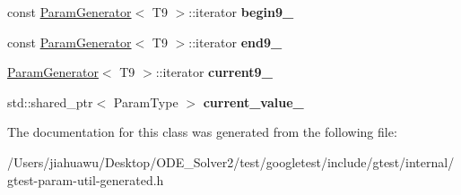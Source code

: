 \begin{DoxyCompactItemize}
\item 
\mbox{\label{classtesting_1_1internal_1_1_cartesian_product_generator9_1_1_iterator_a99069f471668c2f804507cd9af050f26}} 
const \mbox{\hyperlink{classtesting_1_1internal_1_1_param_generator}{Param\+Generator}}$<$ T9 $>$\+::iterator {\bfseries begin9\+\_\+}
\item 
\mbox{\label{classtesting_1_1internal_1_1_cartesian_product_generator9_1_1_iterator_a4046916a22aea7df3959de13dc2ae9be}} 
const \mbox{\hyperlink{classtesting_1_1internal_1_1_param_generator}{Param\+Generator}}$<$ T9 $>$\+::iterator {\bfseries end9\+\_\+}
\item 
\mbox{\label{classtesting_1_1internal_1_1_cartesian_product_generator9_1_1_iterator_a1fc558b062c44ffd7af98afa0ae6ddb2}} 
\mbox{\hyperlink{classtesting_1_1internal_1_1_param_generator}{Param\+Generator}}$<$ T9 $>$\+::iterator {\bfseries current9\+\_\+}
\item 
\mbox{\label{classtesting_1_1internal_1_1_cartesian_product_generator9_1_1_iterator_a0934ef053408f36a601b95b238b76cc5}} 
std\+::shared\+\_\+ptr$<$ Param\+Type $>$ {\bfseries current\+\_\+value\+\_\+}
\end{DoxyCompactItemize}


The documentation for this class was generated from the following file\+:\begin{DoxyCompactItemize}
\item 
/\+Users/jiahuawu/\+Desktop/\+O\+D\+E\+\_\+\+Solver2/test/googletest/include/gtest/internal/gtest-\/param-\/util-\/generated.\+h\end{DoxyCompactItemize}
